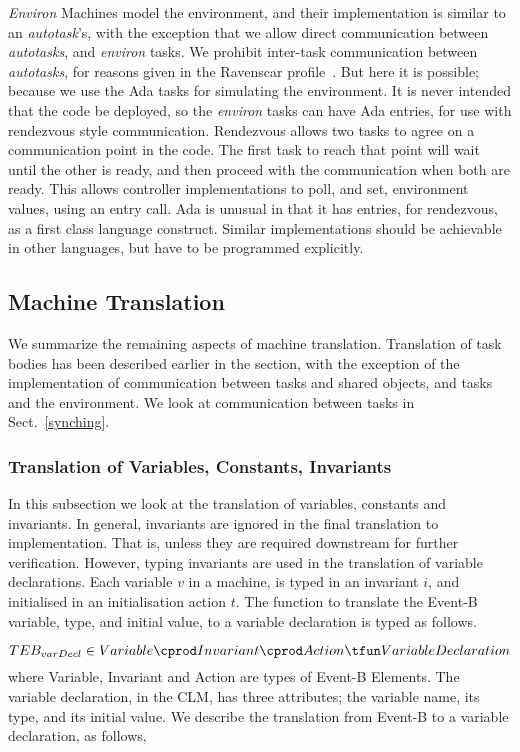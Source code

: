 \emph{Environ} Machines model the environment, and their implementation is similar to an \emph{autotask}'s, with the exception that we allow direct communication between \emph{autotasks}, and \emph{environ} tasks. We prohibit inter-task communication between \emph{autotasks}, for reasons given in the Ravenscar profile~\cite{Burns1999,ravenspark}. But here it is possible; because we use the Ada tasks for simulating the environment. It is never intended that the code be deployed, so the \emph{environ} tasks can have Ada entries, for use with rendezvous style communication. Rendezvous allows two tasks to agree on a communication point in the code. The first task to reach that point will wait until the other is ready, and then proceed with the communication when both are ready. This allows controller implementations to poll, and set, environment values, using an entry call. Ada is unusual in that it has entries, for rendezvous, as a first class language construct. Similar implementations should be achievable in other languages, but have to be programmed explicitly.

\subsection{Machine Translation}\label{MachineTrans}
We summarize the remaining aspects of machine translation. Translation of task bodies has been described earlier in the section, with the exception of the implementation of communication between tasks and shared objects, and tasks and the environment. We look at communication between tasks in Sect.~\ref{synching}.

\subsubsection{Translation of Variables, Constants, Invariants} 
In this subsection we look at the translation of variables, constants and invariants. In general, invariants are ignored in the final translation to implementation. That is, unless they are required downstream for further verification. However, typing invariants are used in the translation of variable declarations. Each variable $v$ in a machine, is typed in an invariant $i$, and initialised in an initialisation action $t$. The function to translate the Event-B variable, type, and initial value, to a variable declaration is typed as follows.

\begin{equation}
TEB_{varDecl} \in Variable \cprod Invariant \cprod Action \tfun VariableDeclaration
\notag
\end{equation}
%
where Variable, Invariant and Action are types of Event-B Elements. The variable declaration, in the CLM, has three attributes; the variable name, its type, and its initial value. We describe the translation from Event-B to a variable declaration, as follows,

